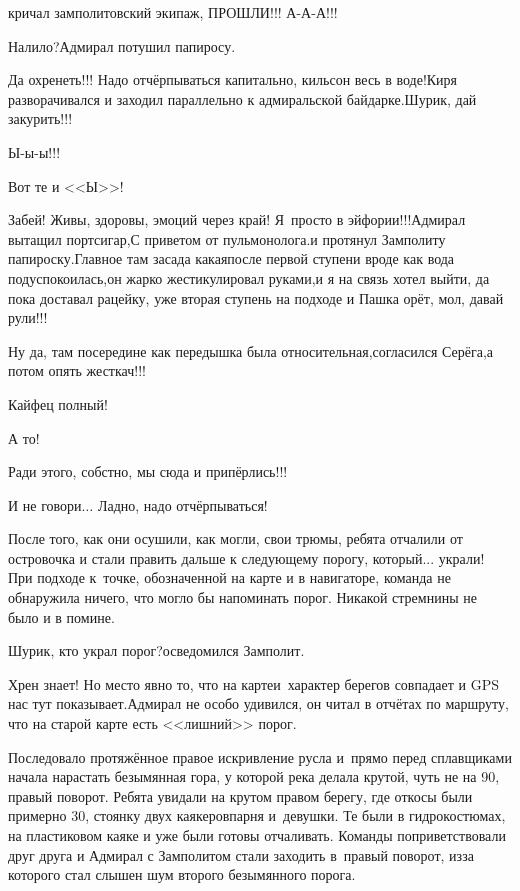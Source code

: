 \mdash кричал замполитовский экипаж, {\large ПРОШЛИ!!!} {\large А-А-А!!!}

\diagdash Налило?\mdash Адмирал потушил папиросу.

\diagdash Да охренеть!!! Надо отчёрпываться капитально, кильсон весь в воде!\mdash Киря разворачивался и заходил параллельно к адмиральской байдарке.\mdash Шурик, дай закурить!!!

\diagdash Ы-ы-ы!!!

\diagdash Вот те и <<Ы>>!

\diagdash Забей! Живы, здоровы, эмоций через край! Я~просто в эйфории!!!\mdash Адмирал вытащил портсигар,\mdash С приветом от пульмонолога.\mdash и протянул Замполиту папироску.\mdash Главное там засада какая\mdash после первой ступени вроде как вода подуспокоилась,\mdash он жарко жестикулировал руками,\mdash и я на связь хотел выйти, да пока доставал рацейку, уже вторая ступень на подходе и Пашка орёт, мол, давай рули!!!

\diagdash Ну да, там посередине как передышка была относительная,\mdash согласился Серёга,\mdash а потом опять жесткач!!!

\diagdash Кайфец полный!

\diagdash А то!

\diagdash Ради этого, собстно, мы сюда и припёрлись!!!

\diagdash И не говори$\ldots$ Ладно, надо отчёрпываться!

После того, как они осушили, как могли, свои трюмы, ребята отчалили от островочка и стали править дальше к следующему порогу, который... украли! При подходе к~точке, обозначенной на карте и в навигаторе, команда не обнаружила ничего, что могло бы напоминать порог. Никакой стремнины не было и в помине.

\diagdash Шурик, кто украл порог?\mdash осведомился Замполит. 

\diagdash Хрен знает! Но место явно то, что на карте\mdash и~характер берегов совпадает и GPS нас тут показывает.\mdash Адмирал не особо удивился, он читал в отчётах по маршруту, что на старой карте есть <<лишний>> порог.

Последовало протяжённое правое искривление русла и~прямо перед сплавщиками начала нарастать безымянная гора, у которой река делала крутой, чуть не на 90\degree, правый поворот. Ребята увидали на крутом правом берегу, где откосы были примерно 30\degree, стоянку двух каякеров\mdash парня и~девушки. Те были в гидрокостюмах, на пластиковом каяке и уже были готовы отчаливать. Команды поприветствовали друг друга и Адмирал с Замполитом стали заходить в~правый поворот, из\sdash за которого стал слышен шум второго безымянного порога.

